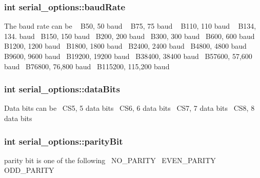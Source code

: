 \subsubsection[{baud\+Rate}]{\setlength{\rightskip}{0pt plus 5cm}int serial\+\_\+options\+::baud\+Rate}\label{structserial__options_a7858a948e686550e34da72355d1671ac}
The baud rate can be ~\newline
 B50, 50 baud ~\newline
 B75, 75 baud ~\newline
 B110, 110 baud ~\newline
 B134, 134. baud~\newline
 B150, 150 baud~\newline
 B200, 200 baud~\newline
 B300, 300 baud~\newline
 B600, 600 baud~\newline
 B1200, 1200 baud~\newline
 B1800, 1800 baud~\newline
 B2400, 2400 baud~\newline
 B4800, 4800 baud~\newline
 B9600, 9600 baud~\newline
 B19200, 19200 baud~\newline
 B38400, 38400 baud~\newline
 B57600, 57,600 baud~\newline
 B76800, 76,800 baud~\newline
 B115200, 115,200 baud~\newline
\subsubsection[{data\+Bits}]{\setlength{\rightskip}{0pt plus 5cm}int serial\+\_\+options\+::data\+Bits}\label{structserial__options_a8cf428ea4d6bd82249b191c18574da5e}
Data bits can be~\newline
 C\+S5, 5 data bits~\newline
 C\+S6, 6 data bits~\newline
 C\+S7, 7 data bits~\newline
 C\+S8, 8 data bits~\newline
\subsubsection[{parity\+Bit}]{\setlength{\rightskip}{0pt plus 5cm}int serial\+\_\+options\+::parity\+Bit}\label{structserial__options_a872c4f9a94607d8b16de115735967e53}
parity bit is one of the following~\newline
 N\+O\+\_\+\+P\+A\+R\+I\+TY~\newline
 E\+V\+E\+N\+\_\+\+P\+A\+R\+I\+TY~\newline
 O\+D\+D\+\_\+\+P\+A\+R\+I\+TY~\newline
